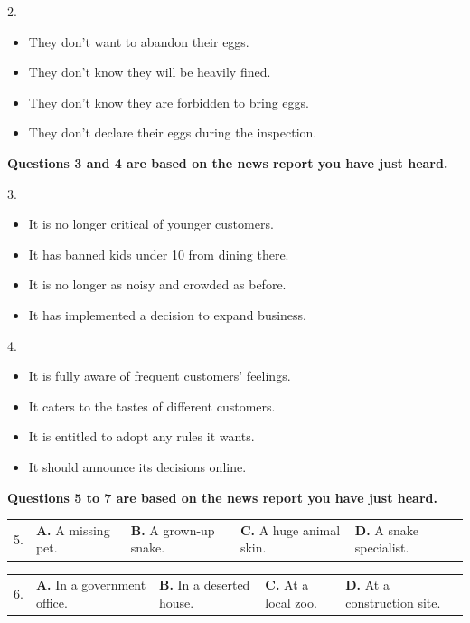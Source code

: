 \documentclass[UTF8,11pt]{ctexart}
\begin{document}
2.


\begin{itemize}[leftmargin=2em,itemsep=.2em,topsep=.4em]\item[A.] They don’t want to abandon their eggs.
\item[B.] They don’t know they will be heavily fined.
\item[C.] They don’t know they are forbidden to bring eggs.
\item[D.] They don’t declare their eggs during the inspection.
\end{itemize}

\textbf{Questions 3 and 4 are based on the news report you have just heard.}


3.


\begin{itemize}[leftmargin=2em,itemsep=.2em,topsep=.4em]\item[A.] It is no longer critical of younger customers.
\item[B.] It has banned kids under 10 from dining there.
\item[C.] It is no longer as noisy and crowded as before.
\item[D.] It has implemented a decision to expand business.
\end{itemize}

4.


\begin{itemize}[leftmargin=2em,itemsep=.2em,topsep=.4em]\item[A.] It is fully aware of frequent customers’ feelings.
\item[B.] It caters to the tastes of different customers.
\item[C.] It is entitled to adopt any rules it wants.
\item[D.] It should announce its decisions online.
\end{itemize}

\textbf{Questions 5 to 7 are based on the news report you have just heard.}


\noindent\begin{tabularx}{\linewidth}{@{}lXXXX@{}}5. & \textbf{A.} A missing pet. & \textbf{B.} A grown-up snake. & \textbf{C.} A huge animal skin. & \textbf{D.} A snake specialist.\\\end{tabularx}\par

\noindent\begin{tabularx}{\linewidth}{@{}lXXXX@{}}6. & \textbf{A.} In a government office. & \textbf{B.} In a deserted house. & \textbf{C.} At a local zoo. & \textbf{D.} At a construction site.\\\end{tabularx}\par
\end{document}
